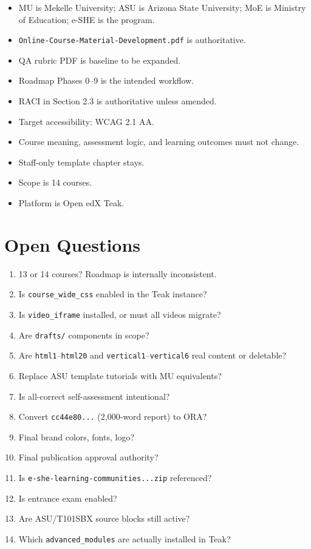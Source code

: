 \begin{itemize}
  \item MU is Mekelle University; ASU is Arizona State University;
        MoE is Ministry of Education; e-SHE is the program.
  \item \texttt{Online-Course-Material-Development.pdf} is authoritative.
  \item QA rubric PDF is baseline to be expanded.
  \item Roadmap Phases 0--9 is the intended workflow.
  \item RACI in Section 2.3 is authoritative unless amended.
  \item Target accessibility: WCAG 2.1 AA.
  \item Course meaning, assessment logic, and learning outcomes must not change.
  \item Staff-only template chapter stays.
  \item Scope is 14 courses.
  \item Platform is Open edX Teak.
\end{itemize}

\section{Open Questions}

\begin{enumerate}
  \item 13 or 14 courses? Roadmap is internally inconsistent.
  \item Is \texttt{course\_wide\_css} enabled in the Teak instance?
  \item Is \texttt{video\_iframe} installed, or must all videos migrate?
  \item Are \texttt{drafts/} components in scope?
  \item Are \texttt{html1}--\texttt{html20} and \texttt{vertical1}--\texttt{vertical6} real content or deletable?
  \item Replace ASU template tutorials with MU equivalents?
  \item Is all-correct self-assessment intentional?
  \item Convert \texttt{cc44e80...} (2{,}000-word report) to ORA?
  \item Final brand colors, fonts, logo?
  \item Final publication approval authority?
  \item Is \texttt{e-she-learning-communities...zip} referenced?
  \item Is entrance exam enabled?
  \item Are ASU/T101SBX source blocks still active?
  \item Which \texttt{advanced\_modules} are actually installed in Teak?
\end{enumerate}